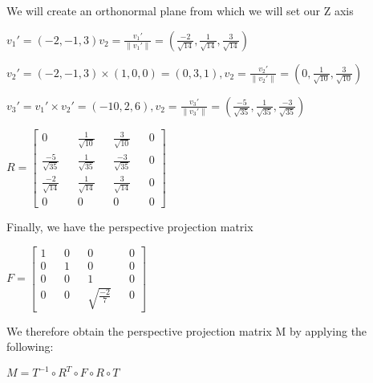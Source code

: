 \documentclass{article}
\begin{document}
\begin{enumerate}
        We will create an orthonormal plane from which we will set our Z axis
        
        $v_1' = (-2, -1, 3)  v_2 = \frac{v_1'}{\|v_1'\|} = (\frac{-2}{\sqrt{14}}, \frac{1}{\sqrt{14}}, \frac{3}{\sqrt{14}})$


        $v_2' = (-2, -1, 3) \times (1, 0 , 0) = (0, 3, 1), v_2 = \frac{v_2'}{\|v_2'\|} = (0, \frac{1}{\sqrt{10}}, \frac{3}{\sqrt{10}})$

        $v_3' = v_1' \times v_2' = (-10, 2, 6), v_2 = \frac{v_3'}{\|v_3'\|} = (\frac{-5}{\sqrt{35}}, \frac{1}{\sqrt{35}}, \frac{-3}{\sqrt{35}})$

        $R = \begin{bmatrix}
            0 && \frac{1}{\sqrt{10}} && \frac{3}{\sqrt{10}} && 0 \\ 
            \frac{-5}{\sqrt{35}} && \frac{1}{\sqrt{35}} && \frac{-3}{\sqrt{35}} && 0 \\ 
            \frac{-2}{\sqrt{14}} && \frac{1}{\sqrt{14}} && \frac{3}{\sqrt{14}} && 0 \\ 
            0 && 0 && 0 && 0
        \end{bmatrix}$


        Finally, we have the perspective projection matrix

        $  F = \begin{bmatrix}
            1 && 0 && 0 && 0 \\ 
            0 && 1 && 0 && 0 \\ 
            0 && 0 && 1 && 0 \\ 
            0 && 0 && \sqrt{\frac{-2}{7}} && 0
        \end{bmatrix}$

        We therefore obtain the perspective projection matrix M by applying the following:

        $M = T^{-1} \circ R^T \circ F \circ R \circ T $

    \end{enumerate}
\end{document}
